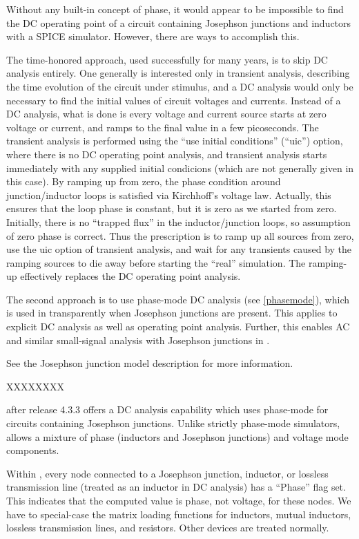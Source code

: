 Without any built-in concept of phase, it would appear to be
impossible to find the DC operating point of a circuit containing
Josephson junctions and inductors with a SPICE simulator.  However,
there are ways to accomplish this.

The time-honored approach, used successfully for many years, is to
skip DC analysis entirely.  One generally is interested only in
transient analysis, describing the time evolution of the circuit under
stimulus, and a DC analysis would only be necessary to find the
initial values of circuit voltages and currents.  Instead of a DC
analysis, what is done is every voltage and current source starts at
zero voltage or current, and ramps to the final value in a few
picoseconds.  The transient analysis is performed using the ``use
initial conditions'' (``{\vt uic}'') option, where there is no DC
operating point analysis, and transient analysis starts immediately
with any supplied initial condicions (which are not generally given in
this case).  By ramping up from zero, the phase condition around
junction/inductor loops is satisfied via Kirchhoff's voltage law. 
Actually, this ensures that the loop phase is constant, but it is zero
as we started from zero.  Initially, there is no ``trapped flux'' in
the inductor/junction loops, so assumption of zero phase is correct. 
Thus the prescription is to ramp up all sources from zero, use the
{\vt uic} option of transient analysis, and wait for any transients
caused by the ramping sources to die away before starting the ``real''
simulation.  The ramping-up effectively replaces the DC operating
point analysis.

The second approach is to use phase-mode DC analysis (see
\ref{phasemode}), which is used in {\WRspice} transparently when
Josephson junctions are present.  This applies to explicit DC analysis
as well as operating point analysis.  Further, this enables AC and
similar small-signal analysis with Josephson junctions in {\WRspice}.

See the Josephson junction model description for more information.

XXXXXXXX

{\WRspice} after release 4.3.3 offers a DC analysis capability which
uses phase-mode for circuits containing Josephson junctions.  Unlike
strictly phase-mode simulators, {\WRspice} allows a mixture of phase
(inductors and Josephson junctions) and voltage mode components.

Within {\WRspice}, every node connected to a Josephson junction,
inductor, or lossless transmission line (treated as an inductor in DC
analysis) has a ``Phase'' flag set.  This indicates that the computed
value is phase, not voltage, for these nodes.  We have to special-case
the matrix loading functions for inductors, mutual inductors, lossless
transmission lines, and resistors.  Other devices are treated
normally.

